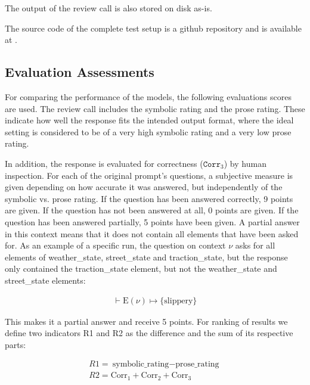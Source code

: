 The output of the review call is also stored on disk as-is.

The source code of the complete test setup is a github repository and is available at \autocite{aisymbolicprogllms}.

\subsection{Evaluation Assessments}
For comparing the performance of the models, the following evaluations scores are used. The review call
includes the symbolic rating and the prose rating. These indicate how well the response fits 
the intended output format, where the ideal setting is considered to be of a very high symbolic 
rating and a very low prose rating. 

In addition, the response is evaluated for correctness ($\texttt{Corr}_3$) by 
human inspection. For each of the original prompt's questions, a subjective measure is given
depending on how accurate it was answered, but independently of the symbolic vs. prose rating.
If the question has been answered correctly, 9 points are given. If the question has not been
answered at all, 0 points are given.
If the question has been answered partially, 5 points have been given. A partial answer in this
context means that it does not contain all elements that have been asked for. 
As an example of a specific run\footnotemark, the question on
context $\nu$ asks for all elements of weather\_state, street\_state and traction\_state, but the
response only contained the traction\_state element, but not the weather\_state and street\_state elements:


\[
\begin{array}{l}
\vdash \text{E}(\nu) \mapsto \{ \text{slippery} \}
\end{array}
\]

This makes it a partial answer and receive 5 points. For ranking of results we define two indicators
R1 and R2 as the difference and the sum of its respective parts:

\[
\begin{array}{l}
R1 = {\text{symbolic\_rating} - \text{prose\_rating}} \\
R2 = {\text{Corr}_{1} + \text{Corr}_{2} + \text{Corr}_{3}} \\
\end{array}
\]



